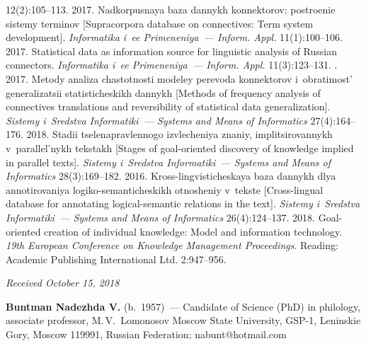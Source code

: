 \begin{multicols}{2}
{{\begin{thebibliography}{99}
12(2):105--113.
 2017. Nadkorpusnaya baza 
dannykh konnektorov: postroenie sistemy terminov [Supracorpora database on connectives: Term 
system development]. \textit{Informatika i~ee Primeneniya~--- Inform. Appl.} 11(1):100--106.
 2017. Statistical data as information source for 
linguistic analysis of Russian connectors. \textit{Informatika i~ee Primeneniya~--- Inform. Appl.} 
11(3):123--131. 
. 2017. Metody analiza 
chastotnosti modeley perevoda konnektorov i~obratimost' generalizatsii statisticheskikh dannykh 
[Methods of frequency analysis of connectives translations and reversibility of statistical data 
generalization]. \textit{Sistemy i~Sredstva Informatiki~--- Systems and Means of Informatics} 
27(4):164--176. 
 2018. Stadii tselenapravlennogo izvlecheniya znaniy, implitsirovannykh 
v~parallel'nykh tekstakh [Stages of goal-oriented discovery of knowledge implied in parallel texts]. 
\textit{Sistemy i~Sredstva Informatiki~--- Systems and Means of Informatics} 28(3):169--182.
 2016. Kross-lingvisticheskaya 
baza dannykh dlya annotirovaniya logiko-semanticheskikh otnosheniy v~tekste [Cross-lingual 
database for annotating logical-semantic relations in the text]. \textit{Sistemy i~Sredstva 
Informatiki~--- Systems and Means of Informatics} 26(4):124--137.
 2018. Goal-oriented creation of individual knowledge: Model and information 
technology. \textit{19th European Conference on Knowledge Management Proceedings}. Reading: 
Academic Publishing International Ltd. 2:947--956.
\end{thebibliography}

 }
 }

\end{multicols}

\vspace*{-6pt}

\hfill{\small\textit{Received October 15, 2018}}



  \Contr
  
  \noindent
  \textbf{Buntman Nadezhda V.} (b.\ 1957)~--- Candidate of Science (PhD) in philology, 
associate professor, M.\,V.~Lomonosov Moscow State University, GSP-1, Leninskie Gory, 
Moscow 119991, Russian Federation; \mbox{nabunt@hotmail.com}
  

